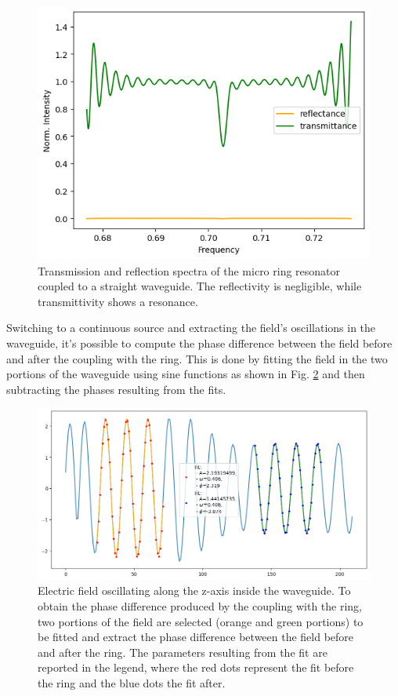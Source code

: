 \begin{figure}[H]
    \centering
    \includegraphics[width=0.8\linewidth]{Figures/ring_spectrum.png}
    \caption{Transmission and reflection spectra of the micro ring resonator coupled to a straight waveguide. The reflectivity is negligible, while transmittivity shows a resonance.}
    \label{fig:ring_spectrum}
\end{figure}

Switching to a continuous source and extracting the field's oscillations in the waveguide, it's possible to compute the phase difference between the field before and after the coupling with the ring. This is done by fitting the field in the two portions of the waveguide using sine functions as shown in Fig. \ref{fig:ring_phase_delay} and then subtracting the phases resulting from the fits.

\begin{figure}[H]
    \centering
    \includegraphics[width=0.8\linewidth]{Figures/ring_phase_delay.png}
    \caption{Electric field oscillating along the z-axis inside the waveguide. To obtain the phase difference produced by the coupling with the ring, two portions of the field are selected (orange and green portions) to be fitted and extract the phase difference between the field before and after the ring. The parameters resulting from the fit are reported in the legend, where the red dots represent the fit before the ring and the blue dots the fit after.}
    \label{fig:ring_phase_delay}
\end{figure}

